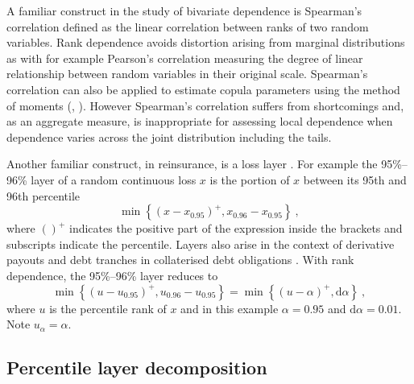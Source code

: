 \documentclass[authoryear]{elsarticle}
\newcommand{\de}{\mathrm{d}}
\begin{document}
A familiar construct in the study of bivariate dependence is Spearman's correlation \citep{embrechts2002correlation} defined as the linear correlation between ranks of two random variables. Rank dependence avoids distortion arising from marginal distributions as with for example Pearson's correlation \citep{mcneil2005qrm} measuring the degree of linear relationship between random variables in their original scale. Spearman's correlation can also be applied to estimate copula parameters using the method of moments (\cite{kojadinovic2010comparison}, \cite{bouye2000copulas}). However Spearman's correlation suffers from shortcomings and, as an aggregate measure, is inappropriate for assessing local dependence when dependence varies across the joint distribution including the tails.


Another familiar construct, in reinsurance, is a loss layer \citep{wang1995insurance}.  For example the 95\%--96\% layer of a random continuous loss $x$ is the portion of $x$ between its 95th and 96th percentile
$$
\min\left\{(x-x_{0.95})^+,x_{0.96}-x_{0.95}\right\}\ ,
$$
where $()^+$ indicates the positive part of the expression inside the brackets and subscripts indicate the percentile. Layers also arise in the context of derivative payouts and debt tranches in collaterised debt obligations \citep{mandel2012role}.  With rank dependence, the 95\%--96\% layer reduces to
\begin{equation}\label{eg}
\min\left\{(u-u_{0.95})^+,u_{0.96}-u_{0.95}\right\} = \min\left\{(u-\alpha)^+,\de\alpha\right\}\ ,
\end{equation}
where $u$ is the percentile rank of $x$ and in this example $\alpha=0.95$ and $\de \alpha=0.01$.  Note $u_\alpha=\alpha$.


\subsection{Percentile layer decomposition}
\end{document}

